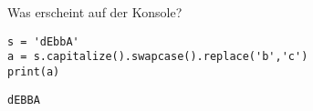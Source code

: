 \question[2] Was erscheint auf der Konsole?
\begin{lstlisting}
s = 'dEbbA'
a = s.capitalize().swapcase().replace('b','c')
print(a)
\end{lstlisting}
\begin{solutionbox}{2cm}
\begin{lstlisting}
dEBBA
\end{lstlisting}
\end{solutionbox}
